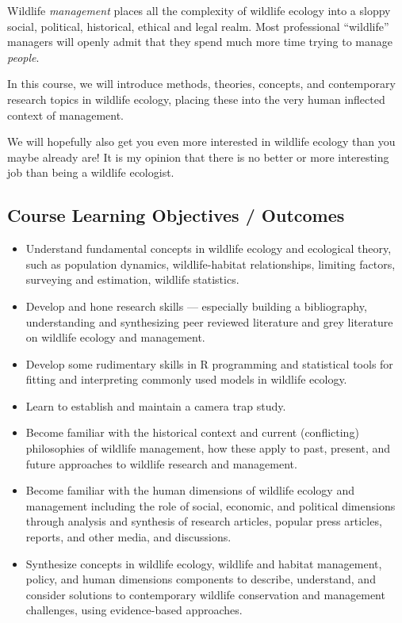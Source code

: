 \documentclass[
  letterpaper,
  DIV=11,
  numbers=noendperiod]{scrartcl}
\providecommand{\tightlist}{%
  \setlength{\itemsep}{0pt}\setlength{\parskip}{0pt}}
\begin{document}
Wildlife \emph{management} places all the complexity of wildlife ecology
into a sloppy social, political, historical, ethical and legal realm.
Most professional ``wildlife'' managers will openly admit that they
spend much more time trying to manage \emph{people}.

In this course, we will introduce methods, theories, concepts, and
contemporary research topics in wildlife ecology, placing these into the
very human inflected context of management.

We will hopefully also get you even more interested in wildlife ecology
than you maybe already are! It is my opinion that there is no better or
more interesting job than being a wildlife ecologist.

\subsection{Course Learning Objectives /
Outcomes}\label{course-learning-objectives-outcomes}

\begin{itemize}
\tightlist
\item
  Understand fundamental concepts in wildlife ecology and ecological
  theory, such as population dynamics, wildlife-habitat relationships,
  limiting factors, surveying and estimation, wildlife statistics.
\item
  Develop and hone research skills --- especially building a
  bibliography, understanding and synthesizing peer reviewed literature
  and grey literature on wildlife ecology and management.
\item
  Develop some rudimentary skills in R programming and statistical tools
  for fitting and interpreting commonly used models in wildlife ecology.
\item
  Learn to establish and maintain a camera trap study.
\item
  Become familiar with the historical context and current (conflicting)
  philosophies of wildlife management, how these apply to past, present,
  and future approaches to wildlife research and management.
\item
  Become familiar with the human dimensions of wildlife ecology and
  management including the role of social, economic, and political
  dimensions through analysis and synthesis of research articles,
  popular press articles, reports, and other media, and discussions.
\item
  Synthesize concepts in wildlife ecology, wildlife and habitat
  management, policy, and human dimensions components to describe,
  understand, and consider solutions to contemporary wildlife
  conservation and management challenges, using evidence-based
  approaches.
\end{itemize}
\end{document}
